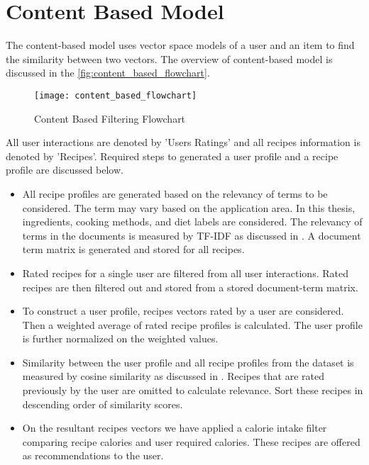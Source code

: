 \section{Content Based Model}

The content-based model uses vector space models of a user and an item to find the similarity between two vectors. The overview of content-based model is discussed in the \autoref{fig:content_based_flowchart}. 

\begin{figure}[H]
	\centering
	\texttt{[image: content\_based\_flowchart]}
	\caption{Content Based Filtering Flowchart }
	\label{fig:content_based_flowchart}
\end{figure}  

\noindent
All user interactions are denoted by 'Users Ratings' and all recipes information is denoted by 'Recipes'. Required steps to generated a user profile and a recipe profile are discussed below.
\begin{itemize}
\item All recipe profiles are generated based on the relevancy of terms to be considered. The term may vary based on the application area. In this thesis, ingredients, cooking methods, and diet labels are considered. The relevancy of terms in the documents is measured by TF-IDF as discussed in . A document term matrix is generated and stored for all recipes. 
\item Rated recipes for a single user are filtered from all user interactions.
Rated recipes are then filtered out and stored from a stored document-term matrix. 
\item To construct a user profile, recipes vectors rated by a user are considered. Then a weighted average of rated recipe profiles is calculated. The user profile is further normalized on the weighted values. 
\item Similarity between the user profile and all recipe profiles from the dataset is measured by cosine similarity as discussed in . Recipes that are rated previously by the user are omitted to calculate relevance. Sort these recipes in descending order of similarity scores.
\item On the resultant recipes vectors we have applied a calorie intake filter comparing recipe calories and user required calories. These recipes are offered as recommendations to the user.  
\end{itemize}
 

